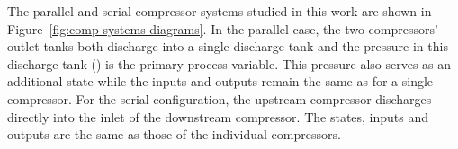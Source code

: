 The parallel and serial compressor systems studied in this work are shown in Figure~\ref{fig:comp-systems-diagrams}.
In the parallel case, the two compressors' outlet tanks both discharge into a single discharge tank and the pressure in this discharge tank () is the primary process variable.
This pressure also serves as an additional state while the inputs and outputs remain the same as for a single compressor.
For the serial configuration, the upstream compressor discharges directly into the inlet of the downstream compressor.
The states, inputs and outputs are the same as those of the individual compressors.
